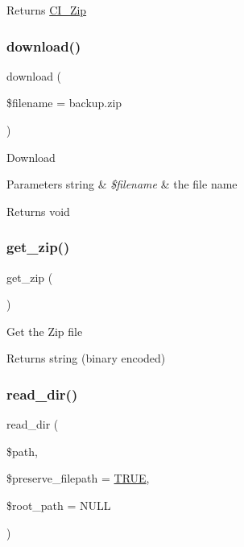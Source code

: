 \begin{DoxyReturn}{Returns}
\mbox{\hyperlink{class_c_i___zip}{C\+I\+\_\+\+Zip}} 
\end{DoxyReturn}
\mbox{\label{class_c_i___zip_ad4263f6c296942842ae25a94053c5f16}} 
\subsubsection{\texorpdfstring{download()}{download()}}
{\footnotesize\ttfamily download (\begin{DoxyParamCaption}\item[{}]{\$filename = {\ttfamily \textquotesingle{}backup.zip\textquotesingle{}} }\end{DoxyParamCaption})}

Download


\begin{DoxyParams}[1]{Parameters}
string & {\em \$filename} & the file name \\
\hline
\end{DoxyParams}
\begin{DoxyReturn}{Returns}
void 
\end{DoxyReturn}
\mbox{\label{class_c_i___zip_a263fd906f99ccca15a12fe34a79656e4}} 
\subsubsection{\texorpdfstring{get\+\_\+zip()}{get\_zip()}}
{\footnotesize\ttfamily get\+\_\+zip (\begin{DoxyParamCaption}{ }\end{DoxyParamCaption})}

Get the Zip file

\begin{DoxyReturn}{Returns}
string (binary encoded) 
\end{DoxyReturn}
\mbox{\label{class_c_i___zip_a296847a86d7cf0e4bba9b71a173cfffe}} 
\subsubsection{\texorpdfstring{read\+\_\+dir()}{read\_dir()}}
{\footnotesize\ttfamily read\+\_\+dir (\begin{DoxyParamCaption}\item[{}]{\$path,  }\item[{}]{\$preserve\+\_\+filepath = {\ttfamily \mbox{\hyperlink{constants_8php_ae04a3efe6aa42044f803ee90c2277846}{T\+R\+UE}}},  }\item[{}]{\$root\+\_\+path = {\ttfamily NULL} }\end{DoxyParamCaption})}

